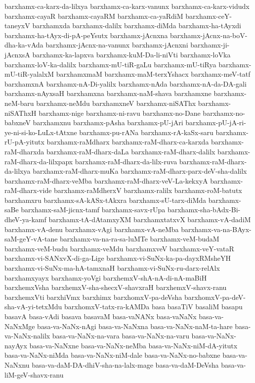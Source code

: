 {barxhamx-ca-karx-da-lilxya
barxhamx-ca-karx-vanunx
barxhamx-ca-karx-vidudx
barxhamx-cayaR
barxhamx-cayaRM
barxhamx-ca-yaRdiM
barxhamx-ceY-taneyxV
barxhamxda
barxhamx-dalilx
barxhamx-diMda
barxhamx-ha-tAyxdi
barxhamx-ha-tAyx-di-pA-peYsutx
barxhamx-jAcnxna
barxhamx-jAcnx-na-boV-dha-ka-vAda
barxhamx-jAcnx-na-vanunx
barxhamx-jAcnxni
barxhamx-ji-jAcnxsA
barxhamx-ka-lapxva
barxhamx-kuM-Da-li-niVti
barxhamx-loVka
barxhamx-loV-ka-dalilx
barxhamx-mU-tiR-gaLu
barxhamx-mU-tiRya
barxhamx-mU-tiR-yalalxM
barxhamxmaM
barxhamx-maM-terxYshacx
barxhamx-meV-tatf
barxhamxnA
barxhamx-nA-Di-yalilx
barxhamx-nAda
barxhamx-nA-da-DA-gali
barxhamx-nAyxsaH
barxhamxna
barxhamx-naM-shava
barxhamxne
barxhamx-neM-baru
barxhamx-neMdu
barxhamxneV
barxhamx-niSAThx
barxhamx-niSAThxH
barxhamx-nige
barxhamx-ni-ravu
barxhamx-no-Dane
barxhamx-no-babxneV
barxhamxnu
barxhamx-pAsha
barxhamx-pU-jAri
barxhamx-pU-jA-ri-ye-ni-si-ko-LuLx-tAtxne
barxhamx-pu-rANa
barxhamx-rA-kaSx-saru
barxhamx-rU-pA-yitutx
barxhamx-raMdharx
barxhamx-raM-dharx-ca-karxda
barxhamx-raM-dharxda
barxhamx-raM-dharx-daLa
barxhamx-raM-dharx-dalilx
barxhamx-raM-dharx-da-lilxpapx
barxhamx-raM-dharx-da-lilx-ruva
barxhamx-raM-dharx-da-lilxya
barxhamx-raM-dharx-muKa
barxhamx-raM-dharx-parx-deV-sha-dalilx
barxhamx-raM-dharx-veMba
barxhamx-raM-dharx-veV-La-kekxyA
barxhamx-raM-dharx-vide
barxhamx-raMdherxV
barxhamx-ralilx
barxhamx-roM-batutx
barxhamxru
barxhamx-sA-kASx-tAkxra
barxhamx-sU-tarx-diMda
barxhamx-saBe
barxhamx-saM-jicnx-tamf
barxhamx-savx-rUpa
barxhamx-sha-bAdx-Bi-dheV-ya-kamf
barxhamx-tA-dAtamxyXM
barxhamxtatxvX
barxhamx-vA-dadiM
barxhamx-vA-denu
barxhamx-vAgi
barxhamx-vA-neMba
barxhamx-va-na-BAyx-saM-geY-vA-tane
barxhamx-va-na-ra-sa-luMTe
barxhamx-veM-budaM
barxhamx-veM-budu
barxhamx-veMdu
barxhamxveV
barxhamx-veY-vataR
barxhamx-vi-SANxvX-di-ga-Lige
barxhamx-vi-SuNx-ka-pa-dayxRMsheYH
barxhamx-vi-SuNx-ma-hA-tamxnaH
barxhamx-vi-SuNx-ru-darx-relAlx
barxhamxyayx
barxhamx-yoVgi
barxhemxV-shA-nA-di-nA-maBiH
barxhemxVsha
barxhemxV-sha-shecxV-shavxraH
barxhemxV-shavx-ranu
barxhemxVti
barxhiVmx
barxhimx
barxhomxV-pa-deVsha
barxhomxV-pa-deV-sha-vA-yi-tetxMdu
barxhomxV-tatx-ra-kAMDa
basa
basaTiV
basaliM
basapu
basavA
basa-vAdi
basava
basavaM
basa-vaNANx
basa-vaNaNx
basa-va-NaNxMge
basa-va-NaNx-nAgi
basa-va-NaNxna
basa-va-NaNx-naM-ta-hare
basa-va-NaNx-nalilx
basa-va-NaNx-na-vara
basa-va-NaNx-na-varu
basa-va-NaNx-nayAyx
basa-va-NaNxne
basa-va-NaNx-neMba
basa-va-NaNx-niM-dA-yitutx
basa-va-NaNx-niMda
basa-va-NaNx-niM-dale
basa-va-NaNx-no-babxne
basa-va-NaNxnu
basa-va-daM-DA-dhiV-sha-na-lalx-mage
basa-va-daM-DeVsha
basa-va-liM-geV-shavx-ranu
}
